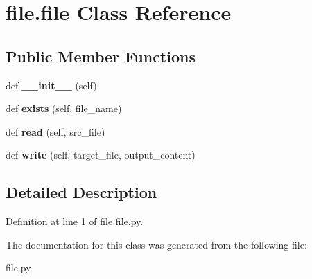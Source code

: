 \hypertarget{classfile_1_1file}{}\section{file.\+file Class Reference}
\label{classfile_1_1file}
\subsection*{Public Member Functions}
\begin{DoxyCompactItemize}
\item 
\mbox{\label{classfile_1_1file_ab090d9bd0278f849d11195aa51738e4e}} 
def {\bfseries \+\_\+\+\_\+init\+\_\+\+\_\+} (self)
\item 
\mbox{\label{classfile_1_1file_a6aba188fd5ba1be0a573f19916a13315}} 
def {\bfseries exists} (self, file\+\_\+name)
\item 
\mbox{\label{classfile_1_1file_a410aad2827c9bf0277194525bce39278}} 
def {\bfseries read} (self, src\+\_\+file)
\item 
\mbox{\label{classfile_1_1file_af0444bd1572b6700fe4fd4f9b579a620}} 
def {\bfseries write} (self, target\+\_\+file, output\+\_\+content)
\end{DoxyCompactItemize}


\subsection{Detailed Description}


Definition at line 1 of file file.\+py.



The documentation for this class was generated from the following file\+:\begin{DoxyCompactItemize}
\item 
file.\+py\end{DoxyCompactItemize}
